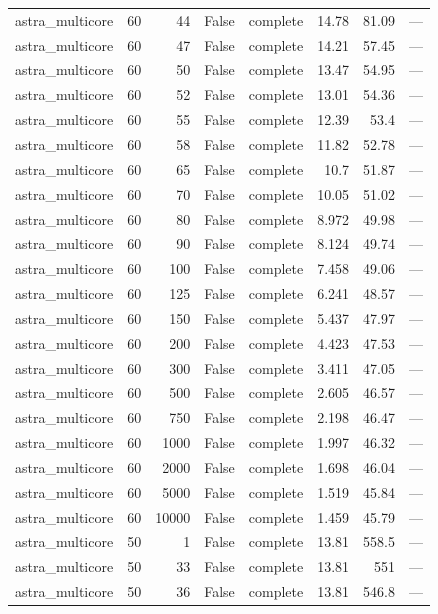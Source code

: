 \begin{tabular}{lrrrlrrl}
astra\_multicore & 60 & 44 & False & complete & 14.78 & 81.09 & — \\
astra\_multicore & 60 & 47 & False & complete & 14.21 & 57.45 & — \\
astra\_multicore & 60 & 50 & False & complete & 13.47 & 54.95 & — \\
astra\_multicore & 60 & 52 & False & complete & 13.01 & 54.36 & — \\
astra\_multicore & 60 & 55 & False & complete & 12.39 & 53.4 & — \\
astra\_multicore & 60 & 58 & False & complete & 11.82 & 52.78 & — \\
astra\_multicore & 60 & 65 & False & complete & 10.7 & 51.87 & — \\
astra\_multicore & 60 & 70 & False & complete & 10.05 & 51.02 & — \\
astra\_multicore & 60 & 80 & False & complete & 8.972 & 49.98 & — \\
astra\_multicore & 60 & 90 & False & complete & 8.124 & 49.74 & — \\
astra\_multicore & 60 & 100 & False & complete & 7.458 & 49.06 & — \\
astra\_multicore & 60 & 125 & False & complete & 6.241 & 48.57 & — \\
astra\_multicore & 60 & 150 & False & complete & 5.437 & 47.97 & — \\
astra\_multicore & 60 & 200 & False & complete & 4.423 & 47.53 & — \\
astra\_multicore & 60 & 300 & False & complete & 3.411 & 47.05 & — \\
astra\_multicore & 60 & 500 & False & complete & 2.605 & 46.57 & — \\
astra\_multicore & 60 & 750 & False & complete & 2.198 & 46.47 & — \\
astra\_multicore & 60 & 1000 & False & complete & 1.997 & 46.32 & — \\
astra\_multicore & 60 & 2000 & False & complete & 1.698 & 46.04 & — \\
astra\_multicore & 60 & 5000 & False & complete & 1.519 & 45.84 & — \\
astra\_multicore & 60 & 10000 & False & complete & 1.459 & 45.79 & — \\
astra\_multicore & 50 & 1 & False & complete & 13.81 & 558.5 & — \\
astra\_multicore & 50 & 33 & False & complete & 13.81 & 551 & — \\
astra\_multicore & 50 & 36 & False & complete & 13.81 & 546.8 & — \\

\end{tabular}

